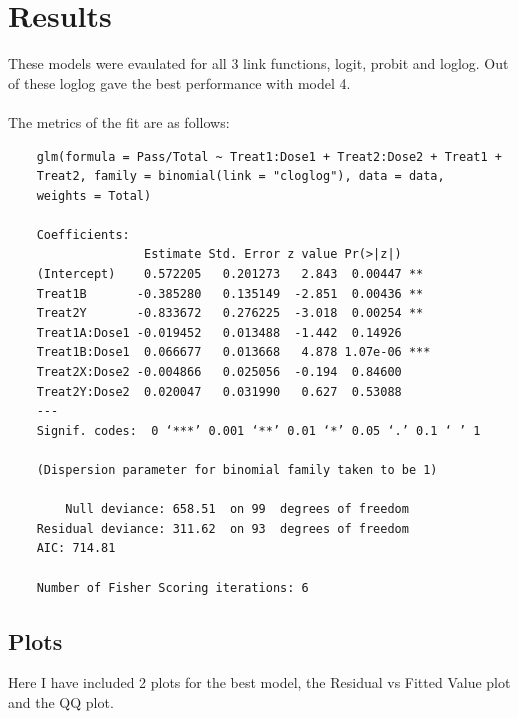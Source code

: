 \documentclass{article}
\begin{document}
\section{Results}
These models were evaulated for all 3 link functions, logit, probit and loglog.
Out of these loglog gave the best performance with model 4.\\
\\
The metrics of the fit are as follows:\\
\begin{verbatim}
    glm(formula = Pass/Total ~ Treat1:Dose1 + Treat2:Dose2 + Treat1 + 
    Treat2, family = binomial(link = "cloglog"), data = data, 
    weights = Total)

    Coefficients:
                   Estimate Std. Error z value Pr(>|z|)    
    (Intercept)    0.572205   0.201273   2.843  0.00447 ** 
    Treat1B       -0.385280   0.135149  -2.851  0.00436 ** 
    Treat2Y       -0.833672   0.276225  -3.018  0.00254 ** 
    Treat1A:Dose1 -0.019452   0.013488  -1.442  0.14926    
    Treat1B:Dose1  0.066677   0.013668   4.878 1.07e-06 ***
    Treat2X:Dose2 -0.004866   0.025056  -0.194  0.84600    
    Treat2Y:Dose2  0.020047   0.031990   0.627  0.53088    
    ---
    Signif. codes:  0 ‘***’ 0.001 ‘**’ 0.01 ‘*’ 0.05 ‘.’ 0.1 ‘ ’ 1

    (Dispersion parameter for binomial family taken to be 1)

        Null deviance: 658.51  on 99  degrees of freedom
    Residual deviance: 311.62  on 93  degrees of freedom
    AIC: 714.81

    Number of Fisher Scoring iterations: 6
\end{verbatim}

\subsection{Plots}
Here I have included 2 plots for the best model, the Residual vs Fitted Value plot and the QQ plot.
\end{document}
